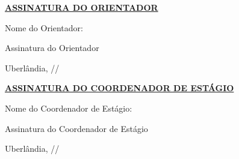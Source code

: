 \documentclass[12pt]{article}
\begin{document}
\vspace{1.5cm}

\begin{center}
    \small
    \underline{\textbf{ASSINATURA DO ORIENTADOR}}
\end{center}

\vspace{0.5cm}

\begin{center}
    Nome do Orientador: \underline{\hspace{8.5cm}}
\end{center}

\vspace{0.5cm}

\begin{center}
    \underline{\hspace{9.5cm}}
    
    Assinatura do Orientador
    
    Uberlândia, \underline{\hspace{1cm}}/\underline{\hspace{1cm}}/\underline{\hspace{1.1cm}}
\end{center}

\vspace{1.5cm}

\begin{center}
    \small
    \underline{\textbf{ASSINATURA DO COORDENADOR DE ESTÁGIO}}
\end{center}

\vspace{0.5cm}

\begin{center}
    Nome do Coordenador de Estágio: \underline{\hspace{8.5cm}}
\end{center}

\vspace{0.5cm}

\begin{center}
    \underline{\hspace{9.5cm}}
    
    Assinatura do Coordenador de Estágio
    
    Uberlândia, \underline{\hspace{1cm}}/\underline{\hspace{1cm}}/\underline{\hspace{1.1cm}}
\end{center}
\end{document}
